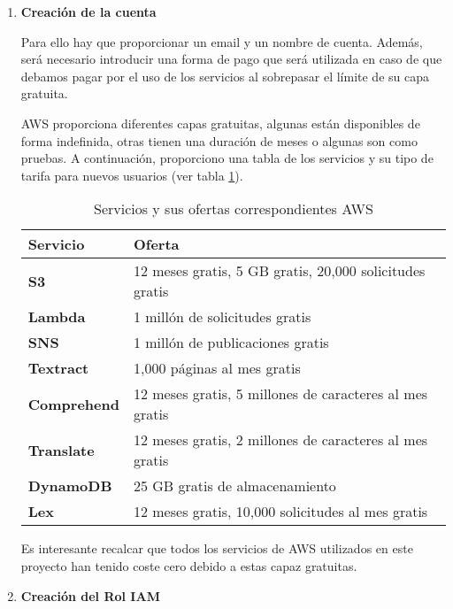 \begin{enumerate}
    \item \textbf{Creación de la cuenta}
    
    Para ello hay que proporcionar un email y un nombre de cuenta. Además, será necesario introducir una forma de pago que será utilizada en caso de que debamos pagar por el uso de los servicios al sobrepasar el límite de su capa gratuita. 

    AWS proporciona diferentes capas gratuitas, algunas están disponibles de forma indefinida, otras tienen una duración de meses o algunas son como pruebas. A continuación, proporciono una tabla de los servicios y su tipo de tarifa para nuevos usuarios (ver tabla \ref{tab:servicios_ofertas}).
    \begin{table}[h]
    \centering
    \begin{tabularx}{\linewidth}{@{}XX@{}}
        \toprule
        \textbf{Servicio} & \textbf{Oferta} \\
        \midrule
        \textbf{S3} & 
        12 meses gratis, 5 GB gratis, 20,000 solicitudes gratis \\
        \midrule
        \textbf{Lambda} & 
        1 millón de solicitudes gratis \\
        \midrule
        \textbf{SNS} & 
        1 millón de publicaciones gratis\\
        \midrule
        \textbf{Textract} & 
        1,000 páginas al mes gratis \\
        \midrule
        \textbf{Comprehend} & 
        12 meses gratis, 5 millones de caracteres al mes gratis \\
        \midrule
        \textbf{Translate} & 
        12 meses gratis, 2 millones de caracteres al mes gratis \\
        \midrule
        \textbf{DynamoDB} & 
        25 GB gratis de almacenamiento \\
        \midrule
        \textbf{Lex} & 
        12 meses gratis, 10,000 solicitudes al mes gratis \\
        \bottomrule
    \end{tabularx}
    \caption{Servicios y sus ofertas correspondientes AWS}
    \label{tab:servicios_ofertas}
\end{table}
    Es interesante recalcar que todos los servicios de AWS utilizados en este proyecto han tenido coste cero debido a estas capaz gratuitas.


    \item \textbf{Creación del Rol IAM}
    

\end{enumerate}
